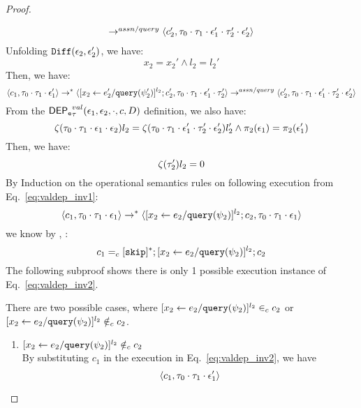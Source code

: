 \begin{proof}
\begin{case}[$P(\cdot)$]
\[\begin{array}{l}
  \rightarrow^{assn/query} 
  \langle {c}_2',  \mathtt{\tau}_0 \cdot \mathtt{\tau}_1 \cdot \mathtt{\epsilon}_1' \cdot \mathtt{\tau}_2' \cdot \mathtt{\epsilon}_2' \rangle 
\end{array}
 \]
%
Unfolding $\mathtt{Diff}(\mathtt{\epsilon}_2,\mathtt{\epsilon}_2')$, we have:
\[
  x_2 = x_2' \land l_2 = l_2' 
\] 
%
Then, we have:
\begin{equation}
\label{eq:valdep_inv2}
  \langle c_1, \mathtt{\tau}_0 \cdot \mathtt{\tau}_1 \cdot \mathtt{\epsilon}_1' \rangle 
  \rightarrow^{*} 
  \langle [\mathrel{ {x}_2 \leftarrow e_2' / {\tt query}(\psi_2') }]^{l_2} ; {c}_2', \mathtt{\tau}_0 \cdot \mathtt{\tau}_1 \cdot \mathtt{\epsilon}_1' \cdot \mathtt{\tau}_2' \rangle 
  \rightarrow^{assn/query} 
  \langle {c}_2',  \mathtt{\tau}_0 \cdot \mathtt{\tau}_1 \cdot \mathtt{\epsilon}_1' \cdot \mathtt{\tau}_2' \cdot \mathtt{\epsilon}_2' \rangle 
\end{equation}
%
From the $\mathsf{DEP_{\mathtt{e}}}^{val}_{\mathtt{\tau}}(\mathtt{\epsilon}_1, \mathtt{\epsilon}_2, \cdot, c, D)$ definition, we also have:
\[
  \mathtt{\zeta}(\mathtt{\tau}_0 \cdot \mathtt{\tau}_1 \cdot \mathtt{\epsilon}_1 \cdot \mathtt{\epsilon}_2) l_2 = 
  \mathtt{\zeta}(\mathtt{\tau}_0 \cdot \mathtt{\tau}_1 \cdot \mathtt{\epsilon}_1' \cdot \mathtt{\tau}_2' \cdot \mathtt{\epsilon}_2') l_2'
  \land 
  \pi_2(\mathtt{\epsilon}_1) = \pi_2(\mathtt{\epsilon}_1')
\] 
Then, we have:
\begin{equation}
\label{eq:valdep_invn}
  \mathtt{\zeta}(\mathtt{\tau}_2') l_2 = 0
\end{equation}
%
%
%
 By Induction on the operational semantics rules on following execution from Eq.~\ref{eq:valdep_inv1}:
 \[\langle c_1, \mathtt{\tau}_0 \cdot \mathtt{\tau}_1 \cdot \mathtt{\epsilon}_1 \rangle
  \rightarrow^{*} 
  \langle [\mathrel{ {x}_2 \leftarrow e_2 / {\tt query}(\psi_2) }]^{l_2};{c}_2, 
  \mathtt{\tau}_0 \cdot \mathtt{\tau}_1 \cdot \mathtt{\epsilon}_1 \rangle \]
 we know by  , :
 \[
 c_1 =_c 
 [\mathtt{skip}]{}^*;[\mathrel{ {x}_2 \leftarrow e_2 / {\tt query}(\psi_2) }]^{l_2};{c}_2
 \]
The following subproof shows there is only 1 possible execution instance of Eq.~\ref{eq:valdep_inv2}.
\begin{subproof}[Subproof]
\label{pf:noiteration_inv2}
There are two possible cases, 
where $[\mathrel{ {x}_2 \leftarrow e_2 / {\tt query}(\psi_2) }]^{l_2} \in_c c_2$ 
or $[\mathrel{ {x}_2 \leftarrow e_2 / {\tt query}(\psi_2) }]^{l_2} \notin_c c_2$.
%
\begin{enumerate}
\item{$[\mathrel{ {x}_2 \leftarrow e_2 / {\tt query}(\psi_2) }]^{l_2}\notin_c c_2$}
\\
By substituting $c_1$ in the execution in Eq.~\ref{eq:valdep_inv2}, we have 
  \[
  \langle c_1, \mathtt{\tau}_0 \cdot \mathtt{\tau}_1 \cdot \mathtt{\epsilon}_1' \rangle 
\]
\end{enumerate}
\end{subproof}
\end{case}
\end{proof}
